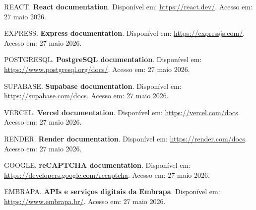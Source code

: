 \documentclass[
  12pt,
  oneside,
  a4paper,
  brazil
]{abntex2}
\begin{document}
REACT. \textbf{React documentation}. Disponível em: \url{https://react.dev/}. Acesso em: 27 maio 2026.

EXPRESS. \textbf{Express documentation}. Disponível em: \url{https://expressjs.com/}. Acesso em: 27 maio 2026.

POSTGRESQL. \textbf{PostgreSQL documentation}. Disponível em: \url{https://www.postgresql.org/docs/}. Acesso em: 27 maio 2026.

SUPABASE. \textbf{Supabase documentation}. Disponível em: \url{https://supabase.com/docs}. Acesso em: 27 maio 2026.

VERCEL. \textbf{Vercel documentation}. Disponível em: \url{https://vercel.com/docs}. Acesso em: 27 maio 2026.

RENDER. \textbf{Render documentation}. Disponível em: \url{https://render.com/docs}. Acesso em: 27 maio 2026.

GOOGLE. \textbf{reCAPTCHA documentation}. Disponível em: \url{https://developers.google.com/recaptcha}. Acesso em: 27 maio 2026.

EMBRAPA. \textbf{APIs e serviços digitais da Embrapa}. Disponível em: \url{https://www.embrapa.br/}. Acesso em: 27 maio 2026.
\end{document}
